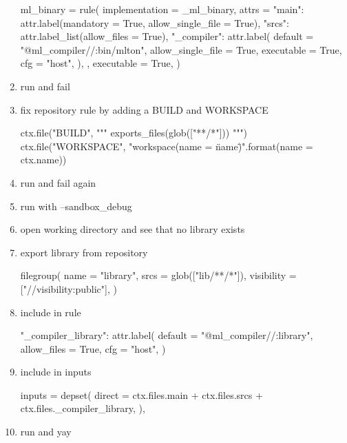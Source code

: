\documentclass{article}
\begin{document}
\begin{enumerate}
\begin{bazel}
ml_binary = rule(
    implementation = _ml_binary,
    attrs = {
        "main": attr.label(mandatory = True, allow_single_file = True),
        "srcs": attr.label_list(allow_files = True),
        "_compiler": attr.label(
            default = "@ml_compiler//:bin/mlton",
            allow_single_file = True,
            executable = True,
            cfg = "host",
        ),
    },
    executable = True,
)
\end{bazel}
    \item run and fail
    \item fix repository rule by adding a BUILD and WORKSPACE
\begin{bazel}
ctx.file("BUILD", """
exports_files(glob(["**/*"]))
""")
ctx.file("WORKSPACE", "workspace(name = \"{name}\")".format(name = ctx.name))
\end{bazel}
    \item run and fail again
    \item run with --sandbox\_debug
    \item open working directory and see that no library exists
    \item export library from repository
\begin{bazel}
filegroup(
    name = "library",
    srcs = glob(["lib/**/*"]),
    visibility = ["//visibility:public"],
)    
\end{bazel}
    \item include in rule
\begin{bazel}
"_compiler_library": attr.label(
    default = "@ml_compiler//:library",
    allow_files = True,
    cfg = "host",
)
\end{bazel}
    \item include in inputs
\begin{bazel}
inputs = depset(
    direct = ctx.files.main + ctx.files.srcs + ctx.files._compiler_library,
),
\end{bazel}
    \item run and yay
\end{enumerate}
\end{document}

